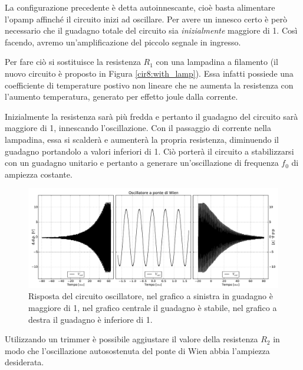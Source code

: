 La configurazione precedente è detta autoinnescante, cioè basta alimentare l'opamp affinché il circuito inizi ad oscillare.
Per avere un innesco certo è però necessario che il guadagno totale del circuito sia \textit{inizialmente} maggiore di \num{1}. Così facendo, avremo un'amplificazione del piccolo segnale in ingresso.

Per fare ciò si sostituisce la resistenza $R_1$ con una lampadina a filamento (il nuovo circuito è proposto in Figura \ref{cir8:with_lamp}).
Essa infatti possiede una coefficiente di temperature postivo non lineare che ne aumenta la resistenza con l'aumento temperatura, generato per effetto joule dalla corrente.

Inizialmente la resistenza sarà più fredda e pertanto il guadagno del circuito sarà maggiore di \num{1}, innescando l'oscillazione.
Con il passaggio di corrente nella lampadina, essa si scalderà e aumenterà la propria resistenza, diminuendo il guadagno portandolo a valori inferiori di \num{1}.
Ciò porterà il circuito a stabilizzarsi con un guadagno unitario e pertanto a generare un'oscillazione di frequenza $f_0$ di ampiezza costante.

\begin{figure}[htpc]
\centering
\includegraphics[width=.95\textwidth]{../E08/latex/wien.pdf}
\caption{Risposta del circuito oscillatore, nel grafico a sinistra in guadagno è maggiore di \num{1}, nel grafico centrale il guadagno è stabile, nel grafico a destra il guadagno è inferiore di \num{1}.}
\label{fig8:wien}
\end{figure}

Utilizzando un trimmer è possibile aggiustare il valore della resistenza $R_2$ in modo che l'oscillazione autosostenuta del ponte di Wien abbia l'ampiezza desiderata.
